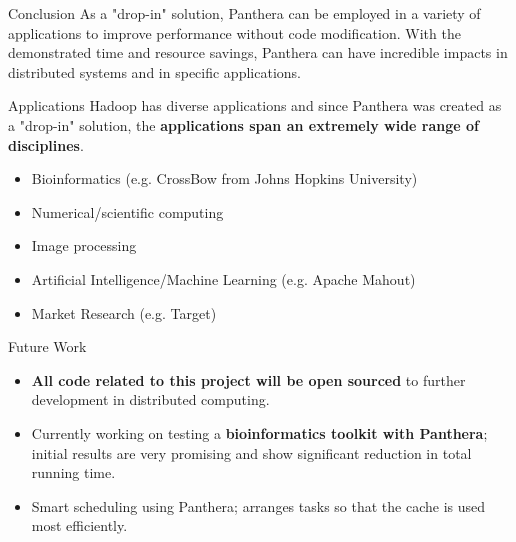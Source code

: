 \documentclass[final]{beamer} %
\begin{document}
\begin{frame}
\begin{columns}[t]
\begin{column}{0.32\textwidth}
\begin{block}{Conclusion}
    	As a "drop-in" solution, Panthera can be employed in a variety of 
    	applications to improve performance without code modification. With the 
    	demonstrated time and resource savings, Panthera can have incredible 
    	impacts in distributed systems and in specific applications.
	
	\end{block}
	
	\begin{block}{Applications}
	Hadoop has diverse applications and since Panthera was created as a "drop-in" solution, the \textbf{applications span an extremely wide range of disciplines}.
	\begin{itemize}
		\item Bioinformatics (e.g. CrossBow from Johns Hopkins University)
		\item Numerical/scientific computing 
		\item Image processing
		\item Artificial Intelligence/Machine Learning (e.g. Apache Mahout)
		\item Market Research (e.g. Target)
	\end{itemize}
	\end{block}
	
	\begin{block}{Future Work}
	\begin{itemize}
		\item \textbf{All code related to this project will be open sourced} to further development in distributed computing.
		\item Currently working on testing a \textbf{bioinformatics toolkit with Panthera}; initial results are very promising and show significant reduction in total running time.
		\item Smart scheduling using Panthera; arranges tasks so that the cache is used most efficiently.
		
	\end{itemize}
	\end{block}
      \end{column}
    \end{columns}
  \end{frame}
    
  
\end{document}
